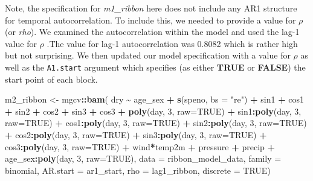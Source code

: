 \documentclass[fleqn,10pt,lineno]{wlpeerj} %
\newenvironment{Shaded}{\begin{snugshade}}{\end{snugshade}}
\newcommand{\AttributeTok}[1]{\textcolor[rgb]{0.13,0.29,0.53}{#1}}
\newcommand{\ConstantTok}[1]{\textcolor[rgb]{0.56,0.35,0.01}{#1}}
\newcommand{\DecValTok}[1]{\textcolor[rgb]{0.00,0.00,0.81}{#1}}
\newcommand{\FunctionTok}[1]{\textcolor[rgb]{0.13,0.29,0.53}{\textbf{#1}}}
\newcommand{\NormalTok}[1]{#1}
\newcommand{\OtherTok}[1]{\textcolor[rgb]{0.56,0.35,0.01}{#1}}
\newcommand{\SpecialCharTok}[1]{\textcolor[rgb]{0.81,0.36,0.00}{\textbf{#1}}}
\newcommand{\StringTok}[1]{\textcolor[rgb]{0.31,0.60,0.02}{#1}}
\begin{document}
Note, the specification for \emph{m1\_ribbon} here does not include
any AR1 structure for temporal autocorrelation. To include this, we needed to
provide a value for \(\rho\) (or \emph{rho}). We examined the autocorrelation within
the model and used the lag-1 value for \(\rho\) .The value for lag-1
autocorrelation was 0.8082 which is
rather high but not surprising. We then updated our model specification with
a value for \(\rho\) as well as the \texttt{A1.start} argument which specifies (as either
\textbf{TRUE} or \textbf{FALSE}) the start point of each block.

\begin{Shaded}
\begin{Highlighting}[]
\NormalTok{m2\_ribbon }\OtherTok{\textless{}{-}}\NormalTok{ mgcv}\SpecialCharTok{::}\FunctionTok{bam}\NormalTok{(}
\NormalTok{  dry }\SpecialCharTok{\textasciitilde{}}\NormalTok{ age\_sex }\SpecialCharTok{+} \FunctionTok{s}\NormalTok{(speno, }\AttributeTok{bs =} \StringTok{"re"}\NormalTok{) }\SpecialCharTok{+} 
\NormalTok{    sin1 }\SpecialCharTok{+}\NormalTok{ cos1 }\SpecialCharTok{+}\NormalTok{ sin2 }\SpecialCharTok{+}\NormalTok{ cos2 }\SpecialCharTok{+}\NormalTok{ sin3 }\SpecialCharTok{+}\NormalTok{ cos3 }\SpecialCharTok{+} 
    \FunctionTok{poly}\NormalTok{(day, }\DecValTok{3}\NormalTok{, }\AttributeTok{raw=}\ConstantTok{TRUE}\NormalTok{) }\SpecialCharTok{+} 
\NormalTok{    sin1}\SpecialCharTok{:}\FunctionTok{poly}\NormalTok{(day, }\DecValTok{3}\NormalTok{, }\AttributeTok{raw=}\ConstantTok{TRUE}\NormalTok{) }\SpecialCharTok{+}
\NormalTok{    cos1}\SpecialCharTok{:}\FunctionTok{poly}\NormalTok{(day, }\DecValTok{3}\NormalTok{, }\AttributeTok{raw=}\ConstantTok{TRUE}\NormalTok{) }\SpecialCharTok{+}
\NormalTok{    sin2}\SpecialCharTok{:}\FunctionTok{poly}\NormalTok{(day, }\DecValTok{3}\NormalTok{, }\AttributeTok{raw=}\ConstantTok{TRUE}\NormalTok{) }\SpecialCharTok{+}
\NormalTok{    cos2}\SpecialCharTok{:}\FunctionTok{poly}\NormalTok{(day, }\DecValTok{3}\NormalTok{, }\AttributeTok{raw=}\ConstantTok{TRUE}\NormalTok{) }\SpecialCharTok{+}
\NormalTok{    sin3}\SpecialCharTok{:}\FunctionTok{poly}\NormalTok{(day, }\DecValTok{3}\NormalTok{, }\AttributeTok{raw=}\ConstantTok{TRUE}\NormalTok{) }\SpecialCharTok{+}
\NormalTok{    cos3}\SpecialCharTok{:}\FunctionTok{poly}\NormalTok{(day, }\DecValTok{3}\NormalTok{, }\AttributeTok{raw=}\ConstantTok{TRUE}\NormalTok{) }\SpecialCharTok{+}
\NormalTok{    wind}\SpecialCharTok{*}\NormalTok{temp2m }\SpecialCharTok{+}\NormalTok{ pressure }\SpecialCharTok{+}\NormalTok{ precip }\SpecialCharTok{+} 
\NormalTok{    age\_sex}\SpecialCharTok{:}\FunctionTok{poly}\NormalTok{(day, }\DecValTok{3}\NormalTok{, }\AttributeTok{raw=}\ConstantTok{TRUE}\NormalTok{),}
  \AttributeTok{data =}\NormalTok{ ribbon\_model\_data,}
  \AttributeTok{family =}\NormalTok{ binomial,}
  \AttributeTok{AR.start =}\NormalTok{ ar1\_start,}
  \AttributeTok{rho =}\NormalTok{ lag1\_ribbon,}
  \AttributeTok{discrete =} \ConstantTok{TRUE}\NormalTok{)}
\end{Highlighting}
\end{Shaded}
\end{document}
